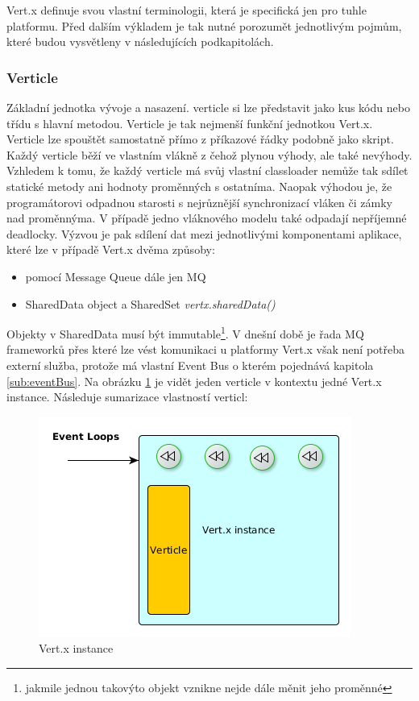 Vert.x definuje svou vlastní terminologii, která je specifická jen pro tuhle platformu. Před dalším výkladem je tak nutné porozumět jednotlivým pojmům, které budou vysvětleny v následujících podkapitolách.

\subsubsection{Verticle}\label{sub:verticle}

Základní jednotka vývoje a nasazení. verticle si lze představit jako kus kódu nebo třídu s hlavní metodou. Verticle je tak nejmenší funkční jednotkou Vert.x. Verticle lze spouštět samostatně přímo z příkazové řádky podobně jako skript. Každý verticle běží ve vlastním vlákně z čehož plynou výhody, ale také nevýhody. Vzhledem k tomu, že každý verticle má svůj vlastní classloader nemůže tak sdílet statické metody ani hodnoty proměnných s ostatníma. Naopak výhodou je, že programátorovi odpadnou starosti s nejrůznější synchronizací vláken či zámky nad proměnnýma. V případě jedno vláknového modelu také odpadají nepříjemné deadlocky. Výzvou je pak sdílení dat mezi jednotlivými komponentami aplikace, které lze v případě Vert.x dvěma způsoby:
\begin{itemize}
\item{pomocí Message Queue\cite{mq} dále jen MQ}
\item{SharedData object a SharedSet \emph{vertx.sharedData()}}
\end{itemize}
Objekty v SharedData musí být immutable\footnote{jakmile jednou takovýto objekt vznikne nejde dále měnit jeho proměnné}. V dnešní době je řada MQ frameworků přes které lze vést komunikaci u platformy Vert.x však není potřeba externí služba, protože má vlastní Event Bus o kterém pojednává kapitola \ref{sub:eventBus}. Na obrázku \ref{fig:instance} je vidět jeden verticle v kontextu jedné Vert.x instance. Následuje sumarizace vlastností verticl:
\begin{figure}
\begin{centering}
\includegraphics[scale=0.5]{obrazky/instance}
\par\end{centering}
\caption{Vert.x instance \label{fig:instance}}
\end{figure}

